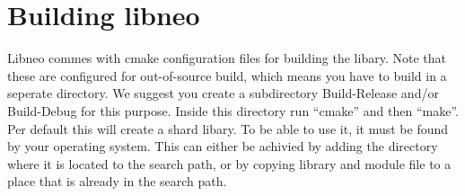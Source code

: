 \chapter{Building libneo}

Libneo commes with cmake configuration files for building the libary.
Note that these are configured for out-of-source build, which means you
have to build in a seperate directory.
We suggest you create a subdirectory Build-Release and/or Build-Debug
for this purpose.
Inside this directory run ``cmake'' and then ``make''.
Per default this will create a shard libary. To be able to use it, it
must be found by your operating system. This can either be achivied by
adding the directory where it is located to the search path, or by
copying library and module file to a place that is already in the search
path.
